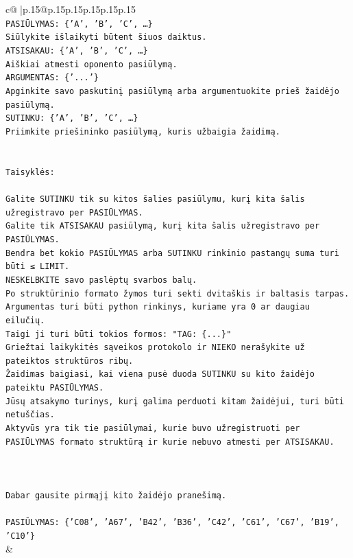 \documentclass{article}
\begin{document}
{\begin{supertabular}{c@{$\;$}|p{.15\linewidth}@{}p{.15\linewidth}p{.15\linewidth}p{.15\linewidth}p{.15\linewidth}p{.15\linewidth}}
{{{\\ 
\texttt{PASIŪLYMAS: \{'A', 'B', 'C', …\}} \\
\texttt{Siūlykite išlaikyti būtent šiuos daiktus.} \\
\texttt{ATSISAKAU: \{'A', 'B', 'C', …\}} \\
\texttt{Aiškiai atmesti oponento pasiūlymą.} \\
\texttt{ARGUMENTAS: \{'...'\}} \\
\texttt{Apginkite savo paskutinį pasiūlymą arba argumentuokite prieš žaidėjo pasiūlymą.} \\
\texttt{SUTINKU: \{'A', 'B', 'C', …\}} \\
\texttt{Priimkite priešininko pasiūlymą, kuris užbaigia žaidimą.} \\
\\ 
\\ 
\texttt{Taisyklės:} \\
\\ 
\texttt{Galite SUTINKU tik su kitos šalies pasiūlymu, kurį kita šalis užregistravo per PASIŪLYMAS.} \\
\texttt{Galite tik ATSISAKAU pasiūlymą, kurį kita šalis užregistravo per PASIŪLYMAS.} \\
\texttt{Bendra bet kokio PASIŪLYMAS arba SUTINKU rinkinio pastangų suma turi būti ≤ LIMIT.} \\
\texttt{NESKELBKITE savo paslėptų svarbos balų.} \\
\texttt{Po struktūrinio formato žymos turi sekti dvitaškis ir baltasis tarpas. Argumentas turi būti python rinkinys, kuriame yra 0 ar daugiau eilučių.} \\
\texttt{Taigi ji turi būti tokios formos: "TAG: \{...\}"} \\
\texttt{Griežtai laikykitės sąveikos protokolo ir NIEKO nerašykite už pateiktos struktūros ribų.} \\
\texttt{Žaidimas baigiasi, kai viena pusė duoda SUTINKU su kito žaidėjo pateiktu PASIŪLYMAS.} \\
\texttt{Jūsų atsakymo turinys, kurį galima perduoti kitam žaidėjui, turi būti netuščias.} \\
\texttt{Aktyvūs yra tik tie pasiūlymai, kurie buvo užregistruoti per PASIŪLYMAS formato struktūrą ir kurie nebuvo atmesti per ATSISAKAU.} \\
\\ 
\\ 
\\ 
\texttt{Dabar gausite pirmąjį kito žaidėjo pranešimą.} \\
\\ 
\texttt{PASIŪLYMAS: \{'C08', 'A67', 'B42', 'B36', 'C42', 'C61', 'C67', 'B19', 'C10'\}} \\
            }
        }
    }
    & \\ \\


\end{supertabular}}
\end{document}
